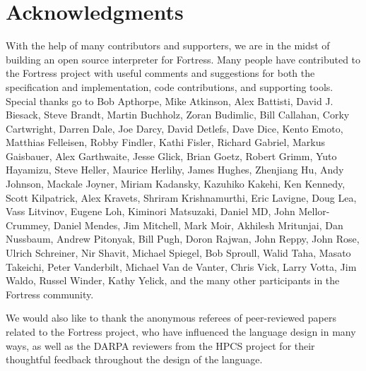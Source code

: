 %
%
%
%

\section{Acknowledgments}

With the help of many contributors and supporters,
we are in the midst of building an open source interpreter for Fortress.
Many people have contributed to the Fortress project with useful comments
and suggestions for both the specification and implementation,
code contributions, and supporting tools. Special thanks go to
%
%
%
Bob      Apthorpe,   %
Mike     Atkinson,
%
Alex     Battisti,
David J. Biesack,    %
Steve    Brandt,
Martin   Buchholz,
Zoran    Budimlic,
%
Bill     Callahan,
Corky    Cartwright,
%
Darren   Dale,
Joe      Darcy,      %
David    Detlefs,
Dave     Dice,       %
%
Kento    Emoto,      %
%
Matthias Felleisen,
Robby    Findler,
Kathi    Fisler,
%
Richard Gabriel,
Markus  Gaisbauer,
Alex    Garthwaite,
Jesse   Glick,
Brian   Goetz,
Robert  Grimm,
%
Yuto      Hayamizu,  %
Steve     Heller,
Maurice   Herlihy,
James     Hughes,    %
Zhenjiang Hu,        %
%
Andy Johnson,        %
Mackale Joyner,
%
Miriam   Kadansky,
Kazuhiko Kakehi,
Ken      Kennedy,
Scott Kilpatrick,    %
Alex     Kravets,
Shriram  Krishnamurthi,
%
Eric   Lavigne,
Doug   Lea,
Vass   Litvinov,
Eugene Loh,
%
Kiminori  Matsuzaki, %
Daniel    MD,
John      Mellor-Crummey,
Daniel    Mendes,    %
Jim       Mitchell,
Mark      Moir,
Akhilesh  Mritunjai,
%
Dan       Nussbaum,
%
Andrew Pitonyak,     %
Bill   Pugh,
%
Doron  Rajwan,
John   Reppy,
John   Rose,         %
%
Ulrich  Schreiner,   %
Nir     Shavit,
Michael Spiegel,     %
Bob     Sproull,
%
Walid  Taha,
Masato Takeichi,     %
%
Peter          Vanderbilt,
Michael Van de Vanter,
Chris          Vick,
Larry          Votta,
%
Jim     Waldo,
Russel  Winder,      %
%
Kathy Yelick,
and the many other participants in the Fortress community.

We would also like to thank the anonymous referees of peer-reviewed
papers related to the Fortress project, who have influenced the
language design in many ways, as well as the DARPA reviewers from
the HPCS project for their thoughtful feedback throughout the
design of the language.
